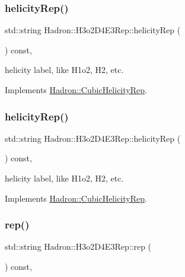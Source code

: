 \subsubsection{\texorpdfstring{helicityRep()}{helicityRep()}\hspace{0.1cm}{\footnotesize\ttfamily [2/3]}}
{\footnotesize\ttfamily std\+::string Hadron\+::\+H3o2\+D4\+E3\+Rep\+::helicity\+Rep (\begin{DoxyParamCaption}{ }\end{DoxyParamCaption}) const\hspace{0.3cm}{\ttfamily [inline]}, {\ttfamily [virtual]}}

helicity label, like H1o2, H2, etc. 

Implements \mbox{\hyperlink{structHadron_1_1CubicHelicityRep_af1096946b7470edf0a55451cc662f231}{Hadron\+::\+Cubic\+Helicity\+Rep}}.

\mbox{\label{structHadron_1_1H3o2D4E3Rep_a12aad531820b348259dc0dfa8c0a259f}} 
\subsubsection{\texorpdfstring{helicityRep()}{helicityRep()}\hspace{0.1cm}{\footnotesize\ttfamily [3/3]}}
{\footnotesize\ttfamily std\+::string Hadron\+::\+H3o2\+D4\+E3\+Rep\+::helicity\+Rep (\begin{DoxyParamCaption}{ }\end{DoxyParamCaption}) const\hspace{0.3cm}{\ttfamily [inline]}, {\ttfamily [virtual]}}

helicity label, like H1o2, H2, etc. 

Implements \mbox{\hyperlink{structHadron_1_1CubicHelicityRep_af1096946b7470edf0a55451cc662f231}{Hadron\+::\+Cubic\+Helicity\+Rep}}.

\mbox{\label{structHadron_1_1H3o2D4E3Rep_ab7eff64255c6e04c36a08a7222b349ad}} 
\subsubsection{\texorpdfstring{rep()}{rep()}\hspace{0.1cm}{\footnotesize\ttfamily [1/5]}}
{\footnotesize\ttfamily std\+::string Hadron\+::\+H3o2\+D4\+E3\+Rep\+::rep (\begin{DoxyParamCaption}{ }\end{DoxyParamCaption}) const\hspace{0.3cm}{\ttfamily [inline]}, {\ttfamily [virtual]}}



